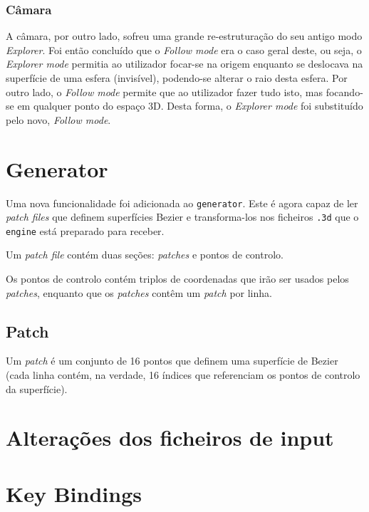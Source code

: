 \documentclass[a4paper]{article}
\begin{document}
\subsubsection{Câmara}

A câmara, por outro lado, sofreu uma grande re-estruturação do seu antigo modo \textit{Explorer}.
Foi então concluído que o \textit{Follow mode} era o caso geral deste, ou seja, o \textit{Explorer mode}
permitia ao utilizador focar-se na origem enquanto se deslocava na superfície de uma esfera (invisível), podendo-se alterar o raio desta esfera. Por outro lado, o \textit{Follow mode} permite
que ao utilizador fazer tudo isto, mas focando-se em qualquer ponto do espaço 3D. Desta forma, o \textit{Explorer mode} foi substituído pelo novo, \textit{Follow mode}.

\section{Generator}

Uma nova funcionalidade foi adicionada ao \texttt{generator}. Este é agora capaz de ler \textit{patch files} que definem superfícies Bezier e transforma-los nos ficheiros \texttt{.3d} que o \texttt{engine} está preparado para receber.

Um \textit{patch file} contém duas seções: \textit{patches} e pontos de controlo.

Os pontos de controlo contém triplos de coordenadas que irão ser usados pelos \textit{patches}, enquanto que os \textit{patches} contêm um \textit{patch} por linha.

\subsection{Patch}

Um \textit{patch} é um conjunto de 16 pontos que definem uma superfície de Bezier (cada linha contém, na verdade, 16 índices que referenciam os pontos de controlo da superfície).

\section{Alterações dos ficheiros de input}\label{sec:estrutura-ficheiros}

\section{Key Bindings}

\end{document}
